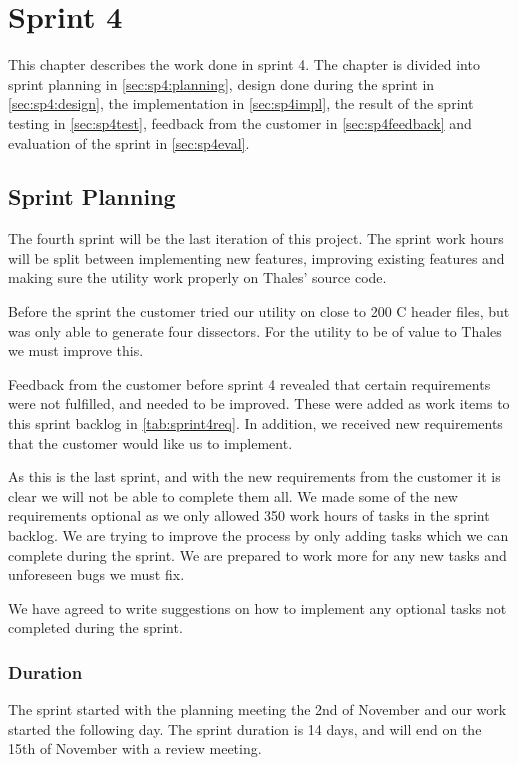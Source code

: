 \chapter{Sprint 4}
This chapter describes the work done in sprint 4. The 
chapter is divided into sprint planning in \autoref{sec:sp4:planning}, design 
done during the sprint in \autoref{sec:sp4:design}, the implementation in 
\autoref{sec:sp4impl}, the result of the sprint testing in 
\autoref{sec:sp4test}, feedback from the customer in 
\autoref{sec:sp4feedback} and evaluation of the sprint in 
\autoref{sec:sp4eval}.

\section{Sprint Planning}
\label{sec:sp4:planning}
The fourth sprint will be the last iteration of this project.
The sprint work hours will be split between implementing new features,
improving existing features and making sure the \gls{utility} work properly
on Thales' source code.

Before the sprint the customer tried our \gls{utility} on close to 200 C
header files, but was only able to generate four \glspl{dissector}.
For the \gls{utility} to be of value to Thales we must improve this.

Feedback from the customer before sprint 4 revealed that certain requirements
were not fulfilled, and needed to be improved. These were added as work items
to this sprint backlog in \autoref{tab:sprint4req}. In addition, we received new
requirements that the customer would like us to implement.

As this is the last sprint, and with the new requirements from the customer it
is clear we will not be able to complete them all. We made some of the new
requirements optional as we only allowed 350 work hours of tasks in the sprint
backlog. We are trying to improve the process by only adding tasks which we
can complete during the sprint. We are prepared to work more for any new tasks
and unforeseen bugs we must fix.

We have agreed to write suggestions on how to implement any optional tasks
not completed during the sprint.

\subsection{Duration}
The sprint started with the planning meeting the 2nd of November and our work started the following day. The sprint duration is 14 days, and will end on the 15th of November with a review meeting. 

